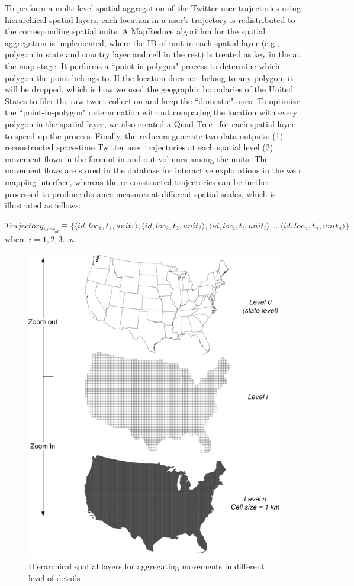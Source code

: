 \documentclass[ijgi,article,submit,moreauthors,pdftex,10pt,a4paper]{mdpi}
\theoremstyle{mdpi}
\newcounter{thm}
\newcounter{ex}
\newcounter{re}
\theoremstyle{mdpidefinition}
\begin{document}
To perform a multi-level spatial aggregation of the Twitter user trajectories using hierarchical spatial layers, each location in a user's trajectory is redistributed to the corresponding spatial units. A MapReduce algorithm for the spatial aggregation is implemented, where the ID of unit in each spatial layer (e.g., polygon in state and country layer and cell in the rest) is treated as key in the at the map stage. It performs a ``point-in-polygon" process to determine which polygon the point belongs to. If the location does not belong to any polygon, it will be dropped, which is how we used the geographic boundaries of the United States to filer the raw tweet collection and keep the ``domestic" ones. To optimize the ``point-in-polygon" determination without comparing the location with every polygon in the spatial layer, we also created a Quad-Tree~\cite{samet1984quadtree} for each spatial layer to speed up the process. Finally, the reducers generate two data outputs: (1) reconstructed space-time Twitter user trajectories at each spatial level (2) movement flows in the form of in and out volumes among the units. The movement flows are stored in the database for interactive explorations in the web mapping interface, whereas the re-constructed trajectories can be further processed to produce distance measures at different spatial scales, which is illustrated as fellows:
\newline

\noindent $Trajectory_{user_{id}} \equiv \lbrace \langle id, loc_{1}, t_{1}, unit_{1}\rangle, \langle id, loc_{2}, t_{2}, unit_{2}\rangle, \langle id, loc_{i}, t_{i}, unit_{i}\rangle, ... \langle id, loc_{n}, t_{n}, unit_{n}\rangle \rbrace$
where $ i = 1, 2, 3...n$

\begin{figure}[h]
\centering
\includegraphics[width=0.6\linewidth]{./figures/multilevel}
\caption{Hierarchical spatial layers for aggregating movements in different level-of-details}
\label{fig:multilevel}
\end{figure}
\FloatBarrier
\end{document}
